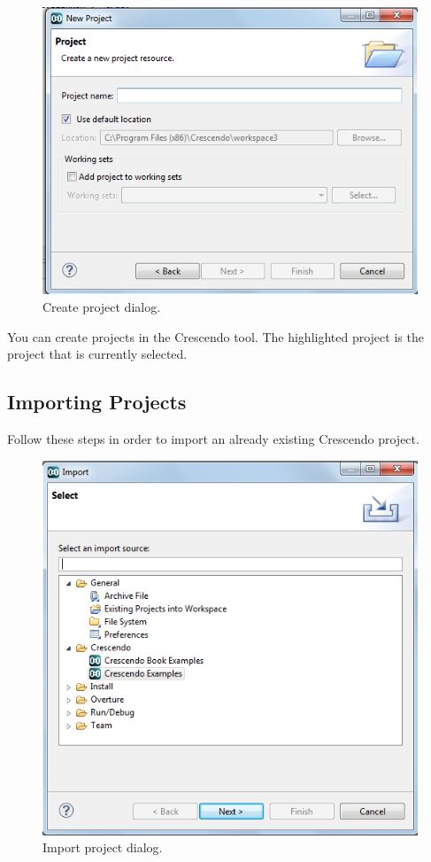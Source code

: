 \documentclass{crescendorepchap}
\begin{document}
\begin{figure}[htbp]
\centering
\includegraphics[width=.6\textwidth]{images/DestecsNewProject.png}
\caption{Create project dialog.\label{fig:NewProject}}
\end{figure}

You can create projects in the Crescendo tool. The highlighted project is
the project that is currently selected.

\subsection{Importing Projects}

Follow these steps in order to import an already existing Crescendo
project.

\begin{figure}[htbp]
\centering
\includegraphics[width=.6\textwidth]{images/DestecsImportDialog.png}
\caption{Import project dialog.\label{fig:ImportDialogue}}
\end{figure}
\end{document}
